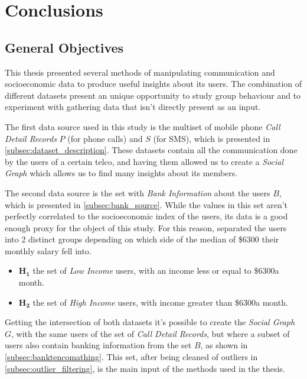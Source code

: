\chapter{Conclusions}
\label{chap:conclusions}

\section{General Objectives}

This thesis presented several methods of manipulating communication and socioeconomic data to produce useful insights about its users.
The combination of different datasets present an unique opportunity to study group behaviour and to experiment with gathering data that isn't directly present as an input.

The first data source used in this study is the multiset of mobile phone \emph{Call Detail Records} $P$ (for phone calls) and $S$ (for SMS), which is presented in \cref{subsec:dataset_description}.
These datasets contain all the communication done by the users of a certain telco, and having them allowed us to create a \emph{Social Graph} which allows us to find many insights about its members.

The second data source is the set with \emph{Bank Information} about the users $B$, which is presented in \cref{subsec:bank_source}.
While the values in this set aren't perfectly correlated to the socioeconomic index of the users, its data is a good enough proxy for the object of this study.
For this reason, separated the users into 2 distinct groups depending on which side of the median of \$6300\footnotemark{} their monthly salary fell into.

\begin{itemize}
	\item $\mathbf{H_1}$ the set of \emph{Low Income} users, with an income less or equal to \$6300\footnotemark[\value{footnote}] a month.
	\item $\mathbf{H_2}$ the set of \emph{High Income} users, with income greater than \$6300\footnotemark[\value{footnote}] a month.
\end{itemize}

Getting the intersection of both datasets it's possible to create the \emph{Social Graph} $G$, with the same users of the set of \emph{Call Detail Records}, but where a subset of users also contain banking information from the set $B$, as shown in \cref{subsec:banktencomathing}.
This set, after being cleaned of outliers in \cref{subsec:outlier_filtering}, is the main input of the methods used in the thesis.

